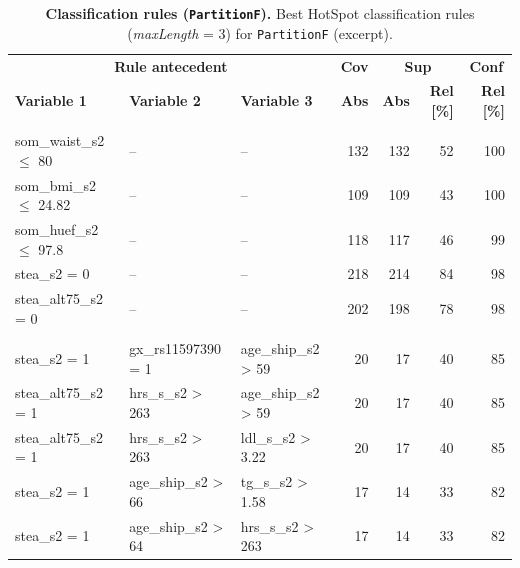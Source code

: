 \documentclass[
  oneside]{book}
\begin{document}
\begin{table}[!h]

\caption{\label{tab:03-rule-list-women}\textbf{Classification rules (\texttt{PartitionF}).} Best HotSpot classification rules (\emph{maxLength} = 3) for \texttt{PartitionF} (excerpt).}
\centering
\begin{tabular}[t]{lllrrrr}
\toprule
\multicolumn{3}{c}{\textbf{Rule antecedent}} & \multicolumn{1}{c}{\textbf{Cov}} & \multicolumn{2}{c}{\textbf{Sup}} & \multicolumn{1}{c}{\textbf{Conf}} \\
\cmidrule(l{3pt}r{3pt}){1-3} \cmidrule(l{3pt}r{3pt}){4-4} \cmidrule(l{3pt}r{3pt}){5-6} \cmidrule(l{3pt}r{3pt}){7-7}
\textbf{Variable 1} & \textbf{Variable 2} & \textbf{Variable 3} & \textbf{Abs} & \textbf{Abs} & \textbf{Rel [\%]} & \textbf{Rel [\%]}\\
\midrule
\addlinespace[0.3em]
\multicolumn{7}{l}{\textbf{Target class: A}}\\
\hspace{1em}som\_waist\_s2 $\leq$ 80 & -- & -- & 132 & 132 & 52 & 100\\
\hspace{1em}som\_bmi\_s2 $\leq$ 24.82 & -- & -- & 109 & 109 & 43 & 100\\
\hspace{1em}som\_huef\_s2 $\leq$ 97.8 & -- & -- & 118 & 117 & 46 & 99\\
\hspace{1em}stea\_s2 = 0 & -- & -- & 218 & 214 & 84 & 98\\
\hspace{1em}stea\_alt75\_s2 = 0 & -- & -- & 202 & 198 & 78 & 98\\
\addlinespace[0.3em]
\multicolumn{7}{l}{\textbf{Target class: B}}\\
\hspace{1em}stea\_s2 = 1 & gx\_rs11597390 = 1 & age\_ship\_s2 > 59 & 20 & 17 & 40 & 85\\
\hspace{1em}stea\_alt75\_s2 = 1 & hrs\_s\_s2 > 263 & age\_ship\_s2 > 59 & 20 & 17 & 40 & 85\\
\hspace{1em}stea\_alt75\_s2 = 1 & hrs\_s\_s2 > 263 & ldl\_s\_s2 > 3.22 & 20 & 17 & 40 & 85\\
\hspace{1em}stea\_s2 = 1 & age\_ship\_s2 > 66 & tg\_s\_s2 > 1.58 & 17 & 14 & 33 & 82\\
\hspace{1em}stea\_s2 = 1 & age\_ship\_s2 > 64 & hrs\_s\_s2 > 263 & 17 & 14 & 33 & 82\\

\end{tabular}
\end{table}
\end{document}
